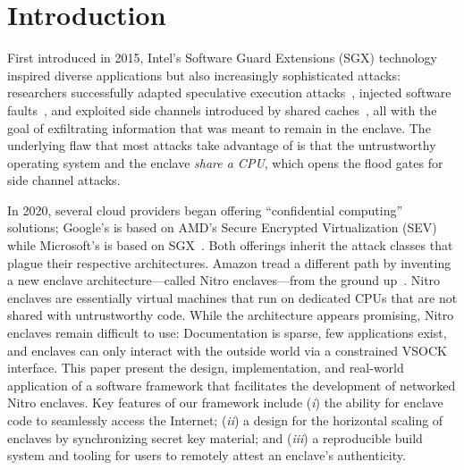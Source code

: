 \section{Introduction}

First introduced in 2015, Intel's Software Guard Extensions (SGX) technology
inspired diverse applications but also increasingly sophisticated attacks:
researchers successfully adapted speculative execution
attacks~\cite{VanBulck2018a}, injected software faults~\cite{Murdock2020a}, and
exploited side channels introduced by shared caches~\cite{Brasser2017a}, all
with the goal of exfiltrating information that was meant to remain in the
enclave.  The underlying flaw that most attacks take advantage of is that the
untrustworthy operating system and the enclave \emph{share a CPU}, which opens
the flood gates for side channel attacks.

In 2020, several cloud providers began offering ``confidential computing''
solutions; Google's is based on AMD's Secure Encrypted Virtualization
(SEV)~\cite{googlecc} while Microsoft's is based on SGX~\cite{azurecc}.  Both
offerings inherit the attack classes that plague their respective architectures.
Amazon tread a different path by inventing a new enclave architecture---called
Nitro enclaves---from the ground up~\cite{nitro-enclaves}.  Nitro enclaves are
essentially virtual machines that run on dedicated CPUs that are not shared with
untrustworthy code.  While the architecture appears promising, Nitro enclaves
remain difficult to use: Documentation is sparse, few applications exist, and
enclaves can only interact with the outside world via a constrained VSOCK
interface.  This paper present the design, implementation, and real-world
application of a software framework that facilitates the development of
networked Nitro enclaves.  Key features of our framework include
(\emph{i}) the ability for enclave code to seamlessly access the Internet;
(\emph{ii}) a design for the horizontal scaling of enclaves by synchronizing
secret key material; and
(\emph{iii}) a reproducible build system and tooling for users to remotely
attest an enclave's authenticity.

